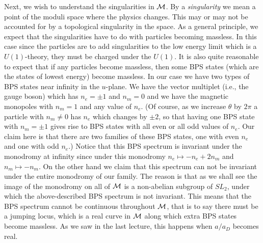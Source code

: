 \documentclass[10pt]{article}
\begin{document}
Next, we wish to understand the singularities in ${\cal M}$.  By a
{\sl singularity}
we mean a point of the moduli space where the physics
changes. This may or may not be accounted for by a topological 
singularity in the space. As a general principle, we expect
that the singularities have to do with particles becoming massless. In
this case since the particles are to add singularities to the low
energy limit which is a $U(1)$-theory, they must be charged under the
$U(1)$. It is also quite reasonable to expect that if any particles
become massless, then some BPS states (which are the states of lowest
energy) become massless. In our case we have two types of BPS states
near infinity in the $u$-plane.  We
have the vector multiplet (i.e., the gauge boson) which has $n_e=\pm1$
and $n_m=0$ and we have the magnetic monopoles with $n_m=1$ and any
value of $n_e$. (Of course, as we increase $\theta$ by $2\pi$ a
particle with $n_m\not=0$ has $n_e$ which changes by $\pm 2$, so that
having one BPS state with $n_m=\pm1$ gives rise to BPS states with all
even or all odd values of $n_e$.  Our claim here is that there are two
families of these BPS states, one with even $n_e$ and one with odd
$n_e$.) 
Notice that this BPS spectrum is invariant under the monodromy at
infinity since under this monodromy $n_e\mapsto -n_e+2n_m$ and
$n_m\mapsto -n_m$.  On the 
other hand we claim that this spectrum can not be invariant under the
entire monodromy of our family. The reason is that as we shall see the
image of the monodromy on all of ${\cal M}$ is a non-abelian subgroup of
$SL_2$, under which the above-described BPS spectrum is not invariant.
This means that the BPS spectrum cannot be continuous throughout
${\cal M}$, that is to say there must be a jumping locus, which is a
real curve in ${\cal M}$ along which extra BPS states become massless.
As we saw in the last lecture, this happens when $a/a_D$ becomes real.
\end{document}
